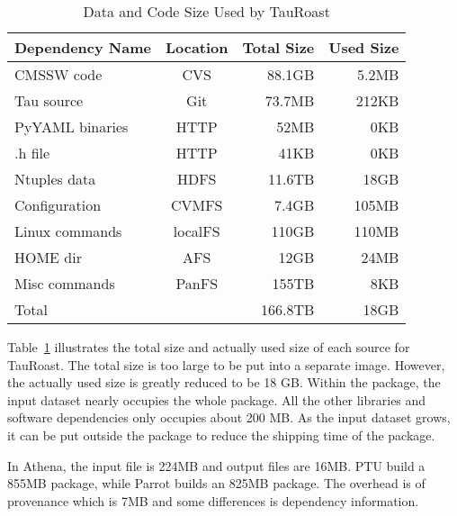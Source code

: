 \begin{table}
\small
	\centering
	    \begin{tabular}{lcrr}
	        \hline
	        \bf Dependency Name & \bf Location & \bf Total Size &  \bf Used Size\\ 
	        \hline
	        CMSSW code     & CVS & 88.1GB &  5.2MB\\ \hline
	        Tau source       & Git & 73.7MB & 212KB \\ \hline
	        PyYAML binaries    & HTTP & 52MB& 0KB \\ \hline
	        .h file       & HTTP& 41KB & 0KB \\ \hline 
	        Ntuples data    & HDFS& 11.6TB & 18GB \\ \hline
	        Configuration & CVMFS & 7.4GB & 105MB \\ \hline
	        Linux commands & localFS & 110GB & 110MB \\ \hline     
	        HOME dir& AFS &12GB & 24MB\\ \hline
	        Misc commands & PanFS & 155TB & 8KB \\ \hline
	        Total      &    & 166.8TB     &  18GB \\ \hline
	    \end{tabular}
	    \normalsize
	    \caption{Data and Code Size Used by TauRoast}
	    \label{table:size-original-real}
\end{table}
	   
Table~\ref{table:size-original-real} illustrates the total size and actually used size of each source for TauRoast. 
The total size is too large to be put into a separate image. However, the actually used size is greatly reduced to be 18 GB.
Within the package, the input dataset nearly occupies the whole package. All the other libraries and software dependencies only occupies about 200 MB.
As the input dataset grows, it can be put outside the package to reduce the shipping time of the package.

In Athena, the input file is 224MB and output files are 16MB. PTU build a 855MB package, while Parrot builds an 825MB package. The overhead is of provenance which is 7MB and 
some differences is dependency information. 
